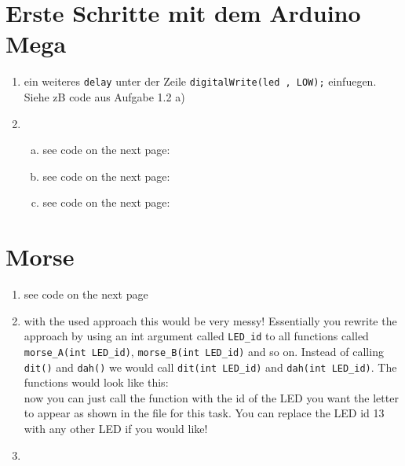 \documentclass[12pt]{article}
\begin{document}
\lstset{language=C++}

\section{ Erste Schritte mit dem Arduino Mega}
\begin{enumerate}
    \item 
        ein weiteres \verb!delay! unter der Zeile \verb!digitalWrite(led , LOW);! einfuegen. Siehe zB code aus Aufgabe 1.2 a)
        
    \item
        \begin{enumerate}[a)]
            \item 
                see code on the next page:\\
                

            \item
                see code on the next page:\\
                

            \item
                see code on the next page:\\
                
                
        \end{enumerate}
\end{enumerate}


    \newpage
\section{Morse}

\begin{enumerate}
    \item
        see code on the next page\\
        

    \item
        with the used approach this would be very messy! Essentially you rewrite the approach by using an int argument called \verb!LED_id! to all functions called \verb!morse_A(int LED_id)!, \verb!morse_B(int LED_id)! and so on. Instead of calling \verb! dit()! and \verb!dah()! we would call \verb!dit(int LED_id)! and \verb!dah(int LED_id)!. The functions would look like this:\\

        

        now you can just call the function with the id of the LED you want the letter to appear as shown in the file for this task. You can replace the LED id 13 with any other LED if you would like!

    \item


\end{enumerate}
\end{document}
